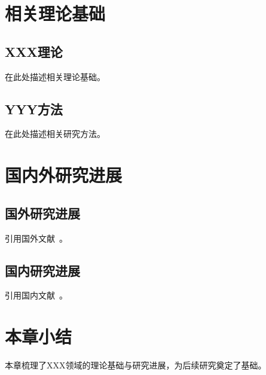 \section{相关理论基础}
\label{sec:theory}

\subsection{XXX理论}
\label{sec:theory_xxx}

在此处描述相关理论基础。

\subsection{YYY方法}
\label{sec:method_yyy}

在此处描述相关研究方法。

\section{国内外研究进展}
\label{sec:literature}

\subsection{国外研究进展}
\label{sec:foreign}

引用国外文献~\cite{smith2021}。

\subsection{国内研究进展}
\label{sec:domestic}

引用国内文献~\cite{zhang2023}。

\section{本章小结}
\label{sec:lit_summary}

本章梳理了XXX领域的理论基础与研究进展，为后续研究奠定了基础。
